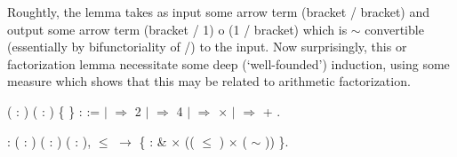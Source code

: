 \coqdocemptyline
 Roughtly, the lemma  takes as input some arrow term (bracket / bracket) and output some  arrow term (bracket / 1) o (1 / bracket) which is \ensuremath{\sim} convertible (essentially by bifunctoriality of /) to the input. Now surprisingly, this  or factorization lemma necessitate some deep (`well-founded') induction, using some measure  which shows that this may be related to arithmetic factorization. \begin{coqdoccode}
\coqdocemptyline
\end{coqdoccode}
\vspace{-.15in} \coqdoceol
\coqdocemptyline
\coqdocnoindent
{}  (  : ) ( :   ) \{ \} :  :=\coqdoceol
\coqdocindent{1.00em}
  \coqdoceol
\coqdocindent{1.00em}
\ensuremath{|}  \coqdocvar{\_} \ensuremath{\Rightarrow} 2\coqdoceol
\coqdocindent{1.00em}
\ensuremath{|}  \coqdocvar{\_} \coqdocvar{\_} \coqdocvar{\_} \ensuremath{\Rightarrow} 4\coqdoceol
\coqdocindent{1.00em}
\ensuremath{|}        \ensuremath{\Rightarrow}     \ensuremath{\times}    \coqdoceol
\coqdocindent{1.00em}
\ensuremath{|}       \ensuremath{\Rightarrow}     +    \coqdoceol
\coqdocindent{1.00em}
.

\coqdocemptyline
\begin{coqdoccode}
\end{coqdoccode}
\vspace{-.15in} \coqdoceol
\coqdocemptyline
\coqdocnoindent
{}  : \coqdockw{\ensuremath{\forall}} ( : ) (  : ) ( :   ),\coqdoceol
\coqdocindent{3.50em}
  \ensuremath{\le}  \ensuremath{\rightarrow} \{  :    \&\coqdoceol
\coqdocindent{17.00em}
  \ensuremath{\times} ((  \ensuremath{\le}  ) \ensuremath{\times} ( \ensuremath{\sim} )) \}.

